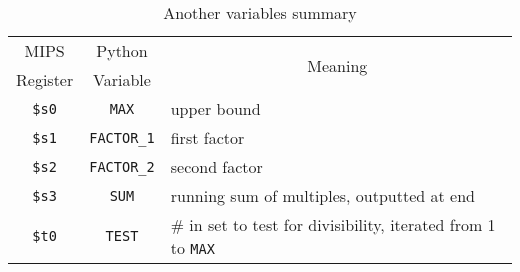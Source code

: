 \begin{table}[H]
\begin{center}

\caption{\small Another variables summary}

\vspace{5mm}

\begin{tabular}{ccc}

\toprule 

MIPS          & Python             & \multirow{2}{*}{Meaning}\\
Register      & Variable           & 
\\

\midrule

\texttt{\$s0} & \texttt{MAX}       & 
\multicolumn{1}{l}{upper bound}
\\

\texttt{\$s1} & \texttt{FACTOR\_1} & 
\multicolumn{1}{l}{first factor}
\\

\texttt{\$s2} & \texttt{FACTOR\_2} & 
\multicolumn{1}{l}{second factor}
\\

\texttt{\$s3} & \texttt{SUM}       & 
\multicolumn{1}{l}{running sum of multiples, outputted at end}
\\

\texttt{\$t0} & \texttt{TEST}      & 
\multicolumn{1}{l}{\# in set to test for divisibility, iterated from 1 to \texttt{MAX}}
\\

\bottomrule

\end{tabular}
\end{center}
\end{table}